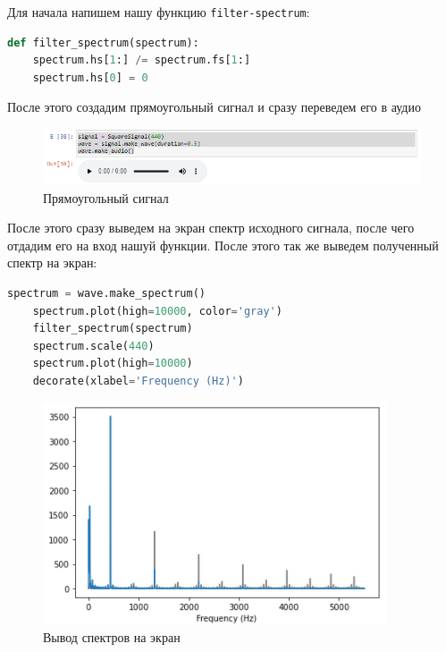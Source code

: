 \documentclass[a4paper]{article}
\begin{document}
            Для начала напишем нашу функцию \texttt{filter-spectrum}:
            
\begin{lstlisting}[language=Python, caption= filter-spectrum]
    def filter_spectrum(spectrum):
    spectrum.hs[1:] /= spectrum.fs[1:]
    spectrum.hs[0] = 0
\end{lstlisting}  
           
           После этого создадим прямоугольный сигнал и сразу переведем его в аудио

            \begin{figure}[H]
                \centering
                \includegraphics[width=\textwidth]{ex_5_square_signal.png}
                \caption{Прямоугольный сигнал}
                \label{fig:ex_5_square_signal}
            \end{figure}
            
            После этого сразу выведем на экран спектр исходного сигнала, после чего отдадим его на вход нашуй функции. После этого так же выведем полученный спектр на экран:
            
\begin{lstlisting}[language=Python, caption= Работа с сигналами]
    spectrum = wave.make_spectrum()
    spectrum.plot(high=10000, color='gray')
    filter_spectrum(spectrum)
    spectrum.scale(440)
    spectrum.plot(high=10000)
    decorate(xlabel='Frequency (Hz)')
\end{lstlisting}               
            
            \begin{figure}[H]
                \centering
                \includegraphics[width=\textwidth]{ex_5_spectr_compare.png}
                \caption{Вывод спектров на экран}
                \label{fig:ex_5_spectr_compare}
            \end{figure}
           
\end{document}
